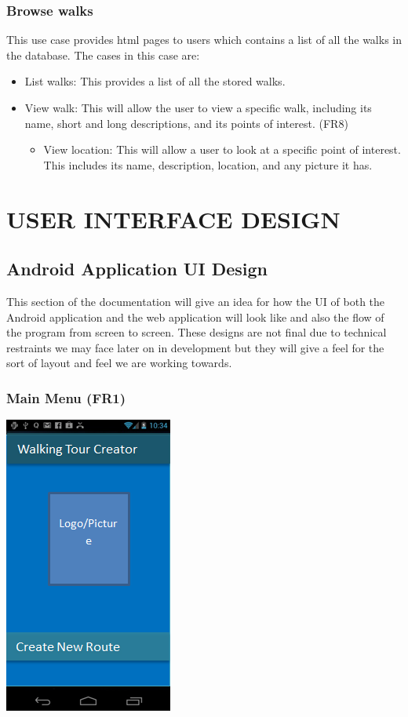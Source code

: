 \documentclass{project}
\begin{document}
\subsubsection{Browse walks}
This use case provides html pages to users which contains a list of all the walks in the database. The cases in this case are: 

\begin{itemize}
\item List walks: This provides a list of all the stored walks.
\item View walk: This will allow the user to view a specific walk, including its name, short and long descriptions, and its points of interest. (FR8)
		\begin{itemize}
		\item View location: This will allow a user to look at a specific point of interest. This includes its name, description, location, and any picture it has.
		\end{itemize}
\end{itemize}

\section{USER INTERFACE DESIGN}

\subsection{Android Application UI Design}
This section of the documentation will give an idea for how the UI of both the Android application and the web application
will look like and also the flow of the program from screen to screen. These designs are not final due to technical
restraints we may face later on in development but they will give a feel for the sort of layout and feel we are working towards.

\subsubsection{Main Menu (FR1)}
\bigskip
\includegraphics{PhoneUI1}
\bigskip
\end{document}
